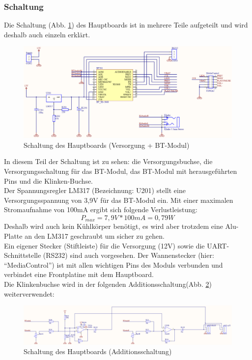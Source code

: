 \subsubsection{Schaltung} \label{subsubsec:4.1.9.2}
Die Schaltung (Abb. \ref{fig:4.1.9.2.1}) des Hauptboards ist in mehrere Teile aufgeteilt und wird deshalb auch einzeln erklärt.
\begin{figure} [H]
	\centering
	\includegraphics[width=1\textwidth]{img/BTModul/hauptboard_sch1.png}
	\caption{Schaltung des Hauptboards (Versorgung + BT-Modul)}\label {fig:4.1.9.2.1}
\end{figure} 
In diesem Teil der Schaltung ist zu sehen: die Versorgungsbuchse, die Versorgungsschaltung für das BT-Modul, das BT-Modul mit herausgeführten Pins und die Klinken-Buchse.\\
Der Spannungsregler LM317 (Bezeichnung: U201) stellt eine Versorgungsspannung von 3,9V für das BT-Modul ein. Mit einer maximalen Stromaufnahme von 100mA ergibt sich folgende Verlustleistung:
\begin{equation}
	P_{max} = 7,9V * 100mA = 0,79W
\end{equation}
Deshalb wird auch kein Kühlkörper benötigt, es wird aber trotzdem eine Alu-Platte an den LM317 geschraubt um sicher zu gehen. \\
Ein eigener Stecker (Stiftleiste) für die Versorgung (12V) sowie die UART-Schnittstelle (RS232) sind auch vorgesehen. Der Wannenstecker (hier: \enquote{MediaControl}) ist mit allen wichtigen Pins des Moduls verbunden und verbindet eine Frontplatine mit dem Hauptboard. \\
Die Klinkenbuchse wird in der folgenden Additionsschaltung(Abb. \ref {fig:4.1.9.2.2}) weiterverwendet:
\begin{figure} [H]
	\centering
	\includegraphics[width=1\textwidth]{img/BTModul/hauptboard_sch2.png}
	\caption{Schaltung des Hauptboards (Additionsschaltung)}\label {fig:4.1.9.2.2}
\end{figure}
